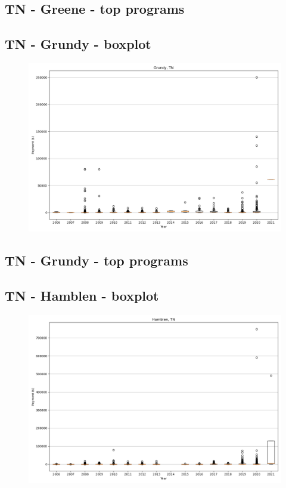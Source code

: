 \subsection*{TN - Greene - top programs}

\newpage
\subsection*{TN - Grundy - boxplot}
\begin{figure}[h]
\centering
\includegraphics[width=7in]{../output/boxplots/counties/Grundy-TN_boxplot.png}
\end{figure}


\subsection*{TN - Grundy - top programs}

\newpage
\subsection*{TN - Hamblen - boxplot}
\begin{figure}[h]
\centering
\includegraphics[width=7in]{../output/boxplots/counties/Hamblen-TN_boxplot.png}
\end{figure}


